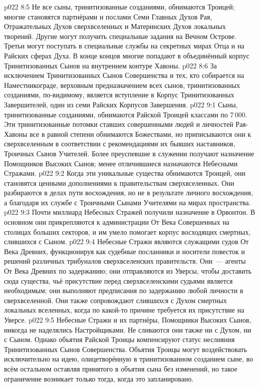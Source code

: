 \vs p022 8:5 Не все сыны, тринитизованные созданиями, обнимаются Троицей; многие становятся партнёрами и послами Семи Главных Духов Рая, Отражательных Духов сверхвселенных и Материнских Духов локальных творений. Другие могут получить специальные задания на Вечном Острове. Третьи могут поступать в специальные службы на секретных мирах Отца и на Райских сферах Духа. В конце концов многие попадают в объединённый корпус Тринитизованных Сынов на внутреннем контуре Хавоны.
\vs p022 8:6 За исключением Тринитизованных Сынов Совершенства и тех, кто собирается на Наместникограде, верховным предназначением всех сынов, тринитизованных созданиями, по\hyp{}видимому, является вступление в Корпус Тринитизованных Завершителей, один из семи Райских Корпусов Завершения.
\vs p022 9:1 Сыны, тринитизованные созданиями, обнимаются Райской Троицей классами по 7\,000. Эти тринитизованные потомки ставших совершенными людей и личностей Рая\hyp{}Хавоны все в равной степени обнимаются Божествами, но приписываются они к сверхвселенным в соответствии с рекомендациями их бывших наставников, Троичных Сынов Учителей. Более преуспевшие в служении получают назначение Помощников Высоких Сынов; менее отличившиеся назначаются Небесными Стражами.
\vs p022 9:2 Когда эти уникальные существа обнимаются Троицей, они становятся ценными дополнениями к правительствам сверхвселенных. Они разбираются в делах пути восхождения, но не в результате личного восхождения, а благодаря их службе с Троичными Сынами Учителями на мирах пространства.
\vs p022 9:3 \pc Почти миллиард Небесных Стражей получили назначение в Орвонтон. В основном они прикрепляются к администрации От Века Совершенных на столицах больших секторов, и им умело помогает корпус восходящих смертных, слившихся с Сыном.
\vs p022 9:4 Небесные Стражи являются служащими судов От Века Древних, функционируя как судебные посланники и носители повесток и решений различных трибуналов сверхвселенских правительств. Они~--- агенты От Века Древних по задержанию; они отправляются из Уверсы, чтобы доставить сюда существа, чьё присутствие перед сверхвселенскими судьями является необходимым; они выполняют предписания по задержанию любой личности в сверхвселенной. Они также сопровождают слившихся с Духом смертных локальных вселенных, когда по какой\hyp{}то причине требуется их присутствие на Уверсе.
\vs p022 9:5 \pc Небесные Стражи и их партнёры, Помощники Высоких Сынов, никогда не наделялись Настройщиками. Не сливаются они также ни с Духом, ни с Сыном. Однако объятия Райской Троицы компенсируют статус неслияния Тринитизованных Сынов Совершенства. Объятия Троицы могут воздействовать исключительно на идею, олицетворённую в тринитизованном созданием сыне, во всём остальном оставляя принятого в объятия сына без изменений, но такое ограничение возникает только тогда, когда это запланировано.
